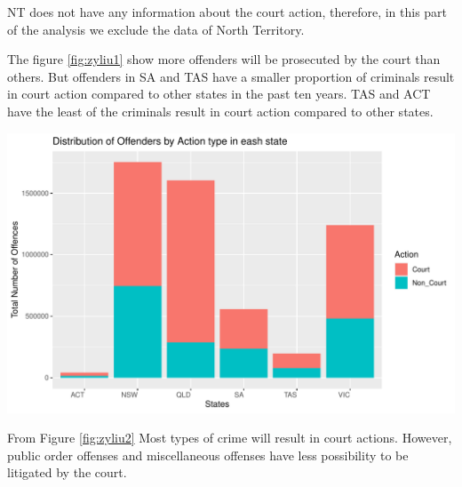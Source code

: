 \documentclass[11pt,a4paper,]{article}
\let\origfigure\figure
\let\endorigfigure\endfigure
\renewenvironment{figure}[1][2] {
\expandafter\origfigure\expandafter[H]
} {
\endorigfigure
}
\begin{document}
NT does not have any information about the court action, therefore, in this part of the analysis we exclude the data of North Territory.

The figure \ref{fig:zyliu1} show more offenders will be prosecuted by the court than others. But offenders in SA and TAS have a smaller proportion of criminals result in court action compared to other states in the past ten years. TAS and ACT have the least of the criminals result in court action compared to other states.

\begin{figure}

{\centering \includegraphics{ETC5513-Assignment4_files/figure-latex/zyliu1-1} 

}

\caption{Distribution of Offenders by Action type}\label{fig:zyliu1}
\end{figure}

From Figure \ref{fig:zyliu2} Most types of crime will result in court actions. However, public order offenses and miscellaneous offenses have less possibility to be litigated by the court.
\end{document}
